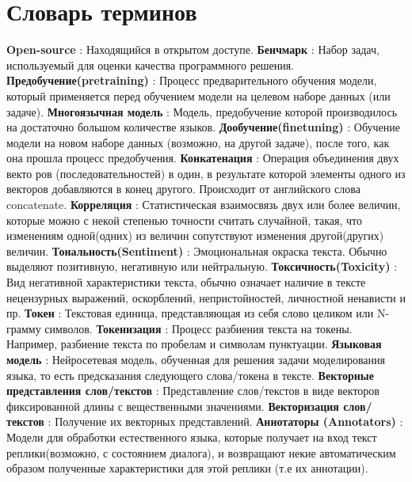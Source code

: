 \chapter*{Словарь терминов}             %
\textbf{Open-source} : Находящийся в открытом доступе. 
\textbf{Бенчмарк} : Набор задач, используемый для оценки качества программного решения. 
\textbf{Предобучение(pretraining)} : Процесс предварительного обучения модели, который
применяется перед обучением модели на целевом наборе данных (или задаче). 
\textbf{Многоязычная модель} : Модель, предобучение которой производилось на достаточно большом количестве языков. 
\textbf{Дообучение(finetuning)} : Обучение модели на новом наборе данных (возможно, на другой задаче), после того, как она прошла процесс предобучения.
\textbf{Конкатенация} : Операция объединения двух векто
ров (последовательностей) в один, в результате которой элементы одного из векторов добавляются в конец другого. Происходит от английского слова concatenate. 
\textbf{Корреляция} : Статистическая взаимосвязь двух или более величин, которые можно с некой степенью точности считать случайной, такая, что изменениям одной(одних) из величин сопутствуют изменения другой(других) величин. 
\textbf{Тональность(Sentiment)} : Эмоциональная окраска текста. Обычно выделяют позитивную, негативную или нейтральную.
\textbf{Токсичность(Toxicity)} : Вид негативной характеристики текста, обычно означает наличие в тексте нецензурных выражений, оскорблений, непристойностей, личностной ненависти и пр.
\textbf{Токен} : Текстовая единица, представляющая из себя слово целиком или N-грамму символов.
\textbf{Токенизация} : Процесс разбиения текста на токены. Например, разбиение текста по пробелам и символам пунктуации. 
\textbf{Языковая модель} : Нейросетевая модель, обученная для решения задачи моделирования языка, то есть предсказания следующего слова/токена в тексте.
\textbf{Векторные представления слов/текстов} : Представление слов/текстов в виде векторов фиксированной длины с вещественными
значениями.  
\textbf{Векторизация слов/текстов} : Получение их векторных представлений. 
\textbf{Аннотаторы (Annotators)} : Модели для обработки естественного языка, которые получает на вход текст реплики(возможно, с состоянием диалога), и возвращают некие автоматическим образом полученные характеристики для этой реплики (т.е их аннотации). 
